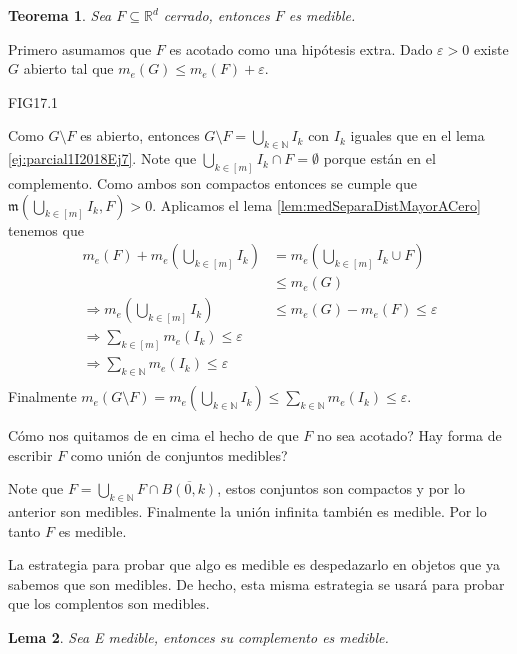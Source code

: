 \documentclass[12pt]{article}
\theoremstyle{plain}
\newtheorem{Th}{Teorema}[subsection]   %
\newtheorem{Lem}[Th]{Lema}             %
\theoremstyle{definition}
\theoremstyle{remark}
\numberwithin{equation}{section}
\newcommand{\bN}{\mathbb{N}}        %
\newcommand{\bR}{\mathbb{R}}        %
\newcommand{\mm}{\mathfrak{m}}      %
\renewcommand{\leq}{\leqslant}      %
\renewcommand{\:}{\colon}           %
\newcommand{\bonj}[1]{\left\lbrack#1\right\rbrack}
\begin{document}
\begin{multicols}{2}
\begin{Th}
  Sea $F\subseteq\bR^d$ cerrado, entonces $F$ es medible.
\end{Th}
\begin{ptcbp}
Primero asumamos que $F$ es acotado como una hipótesis extra. Dado $\varepsilon>0$ existe $G$ abierto tal que $m_e(G)\leq m_e(F)+\varepsilon$.\par
FIG17.1\par
Como $G\setminus F$ es abierto, entonces $G\setminus F=\bigcup_{k\in\bN}I_k$ con $I_k$ iguales que en el lema \ref{ej:parcial1I2018Ej7}. Note que $\bigcup_{k\in\bonj{m}}I_k\cap F=\emptyset$ porque están en el complemento. Como ambos son compactos entonces se cumple que $\mm(\bigcup_{k\in\bonj{m}}I_k,F)>0$. Aplicamos el lema \ref{lem:medSeparaDistMayorACero} tenemos que
\begin{align*}
m_e(F)+m_e(\bigcup_{k\in\bonj{m}}I_k) &=  m_e(\bigcup_{k\in\bonj{m}}I_k\cup F)\\
&\leq  m_e(G)\\
\Rightarrow m_e(\bigcup_{k\in\bonj{m}}I_k) &\leq  m_e(G)-m_e(F)\leq\varepsilon\\
\Rightarrow\sum_{k\in\bonj{m}} m_e(I_k)\leq\varepsilon\\
\Rightarrow\sum_{k\in\bN} m_e(I_k)\leq\varepsilon\\
\end{align*}
Finalmente $m_e(G\setminus F)=m_e(\bigcup_{k\in\bN}I_k)\leq \sum_{k\in\bN} m_e(I_k)\leq\varepsilon$.\par
Cómo nos quitamos de en cima el hecho de que $F$ no sea acotado? Hay forma de escribir $F$ como unión de conjuntos medibles?\par
Note que $F=\bigcup_{k\in\bN}F\cap\overline{B(0,k)}$, estos conjuntos son compactos y por lo anterior son medibles. Finalmente la unión infinita también es medible. Por lo tanto $F$ es medible.
\end{ptcbp}

La estrategia para probar que algo es medible es despedazarlo en objetos que ya sabemos que son medibles. De hecho, esta misma estrategia se usará para probar que los complentos son medibles.

\begin{Lem}
  Sea E medible, entonces su complemento es medible.
\end{Lem}


\end{multicols}
\end{document}
